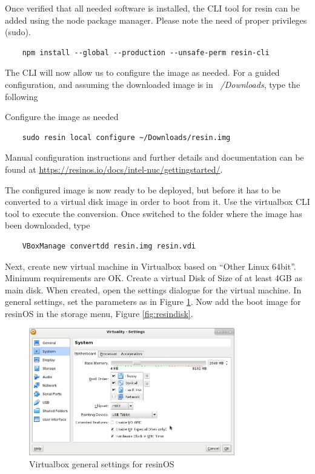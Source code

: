 \documentclass[]{scrartcl}
\begin{document}
Once verified that all needed software is installed, the CLI tool for resin can be added using the node package manager. Please note the need of proper privileges (sudo).

\begin{verbatim}
	npm install --global --production --unsafe-perm resin-cli
\end{verbatim}

The CLI will now allow us to configure the image as needed. For a guided configuration, and assuming the downloaded image is in \textit{~/Downloads}, type the following 

Configure the image as needed
\begin{verbatim}
	sudo resin local configure ~/Downloads/resin.img
\end{verbatim}

Manual configuration instructions and further details and documentation can be found at \url{https://resinos.io/docs/intel-nuc/gettingstarted/}.

The configured image is now ready to be deployed, but before it has to be converted to a virtual disk image in order to boot from it. Use the virtualbox CLI tool to execute the conversion. Once switched to the folder where the image has been downloaded, type
\begin{verbatim}
	VBoxManage convertdd resin.img resin.vdi
\end{verbatim}

Next, create new virtual machine in Virtualbox based on ``Other Linux 64bit''. Minimum requirements are OK. Create a virtual Disk of Size of at least 4GB as main disk. 
When created, open the settings dialogue for the virtual machine. In general settings, set the parameters as in Figure \ref{fig:resingen}. Now add the boot image for resinOS in the storage menu, Figure \ref{fig:resindisk}.

\begin{figure}
	\centering
	\includegraphics[width=0.8\textwidth]{resin-vbox}
	\caption{Virtualbox general settings for resinOS}
	\label{fig:resingen}
\end{figure}
\end{document}
